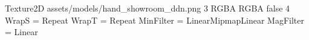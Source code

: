 Texture2D
assets/models/hand_showroom_ddn.png
3
RGBA
RGBA
false
4
WrapS = Repeat
WrapT = Repeat
MinFilter = LinearMipmapLinear
MagFilter = Linear
